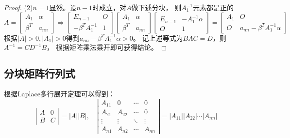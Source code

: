 \begin{proof}
  (2)$n = 1$显然。设$n-1$时成立，对$A$做下述分块，
  则$A_1^{-1}$元素都是正的
  \begin{equation*}
    A = \left[
      \begin{array}{cc}
        A_1&\alpha \\
        \beta^T&a_{nn}
      \end{array}
    \right]  \Rightarrow \left[
      \begin{array}{cc}
        E_{n-1}&O\\
        -\beta^T A_1^{-1}& 1
      \end{array}
    \right] \left[
      \begin{array}{cc}
        A_1&\alpha\\
        \beta^T&a_{nn}
      \end{array}
    \right] \left[
      \begin{array}{cc}
        E_{n-1}&-A_1^{-1}\alpha\\
        O&1
      \end{array}
    \right] = \left[
      \begin{array}{cc}
        A_1&O\\
        O&a_{nn} - \beta^T A^{-1}_1\alpha
      \end{array}
    \right]
  \end{equation*}
  根据$|A| > 0, |A_1|> 0$得到$a_{nn} - \beta^T A_1^{-1}\alpha > 0$。
  记上述等式为$BAC = D$，则$A^{-1} = CD^{-1}B$，
  根据矩阵乘法乘开即可获得结论。
\end{proof}


\subsection{分块矩阵行列式}

\begin{theorem}[分块对角矩阵的行列式]
  根据Laplace多行展开定理可以得到：
  \begin{equation*}
    \left|
      \begin{array}{cc}
        A&0\\
        B&C
      \end{array}
    \right| = |A||B|, \quad
    \left|
      \begin{array}{cccc}
        A_{11}&0&\cdots&0 \\
              A_{21}&A_{22}&\cdots&0 \\
              \vdots&\vdots&\ddots&\vdots \\
              A_{n1}&A_{n2}&\cdots&A_{nn}
      \end{array}
    \right| = |A_{11}| |A_{22}| \cdots |A_{nn}|
  \end{equation*}
\end{theorem}

